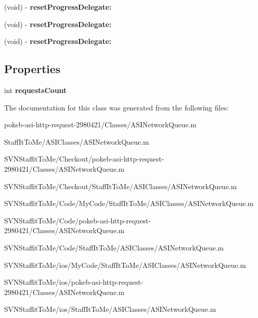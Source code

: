 \begin{DoxyCompactItemize}
\item 
\hypertarget{interface_a_s_i_network_queue_07_08_a44ecca8cbb719f930f52221d917bfbaf}{
(void) -\/ {\bfseries reset\-Progress\-Delegate\-:}}
\label{interface_a_s_i_network_queue_07_08_a44ecca8cbb719f930f52221d917bfbaf}

\item 
\hypertarget{interface_a_s_i_network_queue_07_08_a44ecca8cbb719f930f52221d917bfbaf}{
(void) -\/ {\bfseries reset\-Progress\-Delegate\-:}}
\label{interface_a_s_i_network_queue_07_08_a44ecca8cbb719f930f52221d917bfbaf}

\item 
\hypertarget{interface_a_s_i_network_queue_07_08_a44ecca8cbb719f930f52221d917bfbaf}{
(void) -\/ {\bfseries reset\-Progress\-Delegate\-:}}
\label{interface_a_s_i_network_queue_07_08_a44ecca8cbb719f930f52221d917bfbaf}

\end{DoxyCompactItemize}
\subsection*{\-Properties}
\begin{DoxyCompactItemize}
\item 
\hypertarget{interface_a_s_i_network_queue_07_08_a94edc68953eb93f38b65191398f1267f}{
int {\bfseries requests\-Count}}
\label{interface_a_s_i_network_queue_07_08_a94edc68953eb93f38b65191398f1267f}

\end{DoxyCompactItemize}


\-The documentation for this class was generated from the following files\-:\begin{DoxyCompactItemize}
\item 
pokeb-\/asi-\/http-\/request-\/2980421/\-Classes/\-A\-S\-I\-Network\-Queue.\-m\item 
\-Staff\-It\-To\-Me/\-A\-S\-I\-Classes/\-A\-S\-I\-Network\-Queue.\-m\item 
\-S\-V\-N\-Staffit\-To\-Me/\-Checkout/pokeb-\/asi-\/http-\/request-\/2980421/\-Classes/\-A\-S\-I\-Network\-Queue.\-m\item 
\-S\-V\-N\-Staffit\-To\-Me/\-Checkout/\-Staff\-It\-To\-Me/\-A\-S\-I\-Classes/\-A\-S\-I\-Network\-Queue.\-m\item 
\-S\-V\-N\-Staffit\-To\-Me/\-Code/\-My\-Code/\-Staff\-It\-To\-Me/\-A\-S\-I\-Classes/\-A\-S\-I\-Network\-Queue.\-m\item 
\-S\-V\-N\-Staffit\-To\-Me/\-Code/pokeb-\/asi-\/http-\/request-\/2980421/\-Classes/\-A\-S\-I\-Network\-Queue.\-m\item 
\-S\-V\-N\-Staffit\-To\-Me/\-Code/\-Staff\-It\-To\-Me/\-A\-S\-I\-Classes/\-A\-S\-I\-Network\-Queue.\-m\item 
\-S\-V\-N\-Staffit\-To\-Me/ios/\-My\-Code/\-Staff\-It\-To\-Me/\-A\-S\-I\-Classes/\-A\-S\-I\-Network\-Queue.\-m\item 
\-S\-V\-N\-Staffit\-To\-Me/ios/pokeb-\/asi-\/http-\/request-\/2980421/\-Classes/\-A\-S\-I\-Network\-Queue.\-m\item 
\-S\-V\-N\-Staffit\-To\-Me/ios/\-Staff\-It\-To\-Me/\-A\-S\-I\-Classes/\-A\-S\-I\-Network\-Queue.\-m\end{DoxyCompactItemize}
